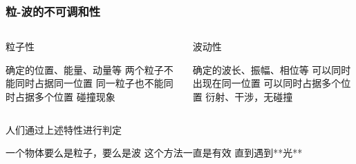 \begin{frame}
    \frametitle{粒-波的不可调和性}
	\begin{columns}
		\begin{column}[t]{0.46\linewidth}
			粒子性
			\begin{itemize}
				\Item  确定的位置、能量、动量等
				\Item  两个粒子不能同时占据同一位置
				\Item  同一粒子也不能同时占据多个位置
				\Item  碰撞现象
			\end{itemize}
		\end{column}
		\begin{column}[t]{0.46\linewidth}
			波动性
			\vspace{1ex}
			\begin{itemize}
				\Item  确定的波长、振幅、相位等
				\Item  可以同时出现在同一位置
				\Item  可以同时占据多个位置
				\Item  衍射、干涉，无碰撞
			\end{itemize}
		\end{column}
	\end{columns}
\end{frame}

\begin{frame} 
    人们通过上述特性进行判定\\
    \begin{itemize}
        \Item  一个物体要么是粒子，要么是波
        \Item  这个方法一直是有效
        \Item  直到遇到**光** 
    \end{itemize}   
    \begin{figure}
        \centering
    \end{figure} 
    \setcounter{subfigure}{0}
\end{frame}

